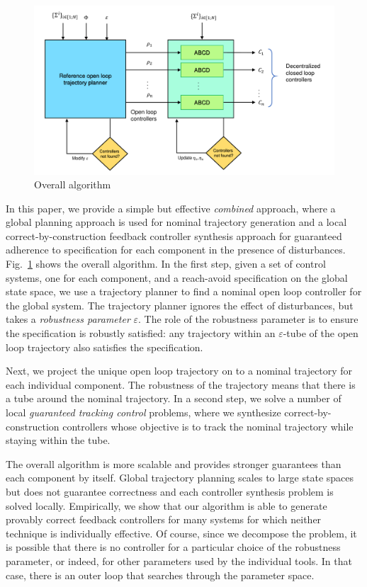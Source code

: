 \begin{figure}[t]
\includegraphics[scale=0.28]{figures/Algorithm_outline.pdf}
\caption{Overall algorithm\label{fig:overall}}
\end{figure}

In this paper, we provide a simple but effective \emph{combined} approach, where a global planning approach is used for nominal trajectory generation and 
a local correct-by-construction feedback controller synthesis approach for guaranteed adherence to specification for each component
in the presence of disturbances.
Fig.~\ref{fig:overall} shows the overall algorithm.
In the first step, 
given a set of control systems, one for each component, and a reach-avoid specification on the global state space, we use a trajectory planner to
find a nominal open loop controller for the global system.
The trajectory planner ignores the effect of disturbances, but takes a \emph{robustness parameter} $\varepsilon$.
The role of the robustness parameter is to ensure the specification is robustly satisfied: any trajectory within an $\varepsilon$-tube
of the open loop trajectory also satisfies the specification.

Next, we project the unique open loop trajectory on to a nominal trajectory for each individual component.
The robustness of the trajectory means that there is a tube around the nominal trajectory.
In a second step, we solve a number of local \emph{guaranteed tracking control} problems, where we synthesize correct-by-construction
controllers whose objective is to track the nominal trajectory while staying within the tube.

The overall algorithm is more scalable and provides stronger guarantees
than each component by itself.
Global trajectory planning scales to large state spaces but does not guarantee correctness
and each controller synthesis problem is solved locally.
Empirically, we show that our algorithm is able to generate provably correct feedback controllers for many
systems for which neither technique is individually effective.
Of course, since we decompose the problem, it is possible that there is no controller for a particular choice of the
robustness parameter, or indeed, for other parameters used by the individual tools.
In that case, there is an outer loop that searches through the parameter space.


